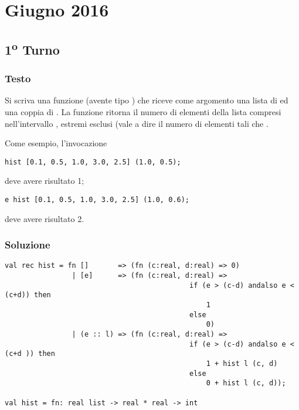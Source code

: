 \section{Giugno 2016}

\subsection{1\textsuperscript{o} Turno}

\subsubsection{Testo}

Si scriva una funzione  (avente tipo ) che riceve come argomento una lista di  ed una coppia di .
La funzione  ritorna il numero di elementi della lista compresi nell'intervallo , estremi esclusi (vale a dire il numero di elementi  tali che .

\medskip
Come esempio, l'invocazione

\begin{lstlisting}
hist [0.1, 0.5, 1.0, 3.0, 2.5] (1.0, 0.5);
\end{lstlisting}

deve avere risultato 1;

\begin{lstlisting}
e hist [0.1, 0.5, 1.0, 3.0, 2.5] (1.0, 0.6);
\end{lstlisting}

deve avere risultato 2.

\subsubsection{Soluzione}

\begin{lstlisting}[style = SML, caption = {Definizione della funzione \sml{hist}}]
val rec hist = fn []	   => (fn (c:real, d:real) => 0)
				| [e]	   => (fn (c:real, d:real) =>
											if (e > (c-d) andalso e < (c+d)) then
												1
											else
												0)
				| (e :: l) => (fn (c:real, d:real) =>
											if (e > (c-d) andalso e < (c+d )) then
												1 + hist l (c, d)
											else
												0 + hist l (c, d));

val hist = fn: real list -> real * real -> int
\end{lstlisting}

